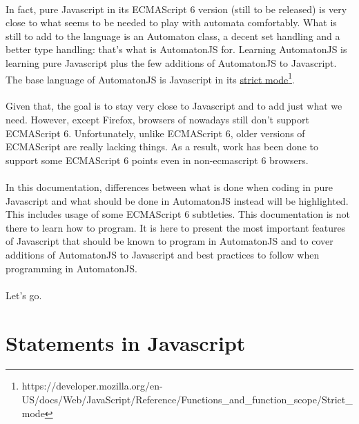 \documentclass{article}
\begin{document}
\begin{sloppypar}
   
\paragraph{}
In fact, pure Javascript in its ECMAScript 6 version (still to be released) is very close to what seems to be needed to play with automata comfortably. What is still to add to the language is an Automaton class, a decent set handling and a better type handling: that's what is AutomatonJS for. Learning AutomatonJS is learning pure Javascript plus the few additions of AutomatonJS to Javascript. The base language of AutomatonJS is Javascript in its \href{https://developer.mozilla.org/en-US/docs/Web/JavaScript/Reference/Functions_and_function_scope/Strict_mode}{strict mode}\footnote{https://developer.mozilla.org/en-US/docs/Web/JavaScript/Reference/Functions\_and\_function\_scope/Strict\_mode}.

   
\paragraph{}
Given that, the goal is to stay very close to Javascript and to add just what we need. However, except Firefox, browsers of nowadays still don't support ECMAScript 6. Unfortunately, unlike ECMAScript 6, older versions of ECMAScript are really lacking things. As a result, work has been done to support some ECMAScript 6 points even in non-ecmascript 6 browsers.

   
\paragraph{}
In this documentation, differences between what is done when coding in pure Javascript and what should be done in AutomatonJS instead will be highlighted. This includes usage of some ECMAScript 6 subtleties. This documentation is not there to learn how to program. It is here to present the most important features of Javascript that should be known to program in AutomatonJS and to cover additions of AutomatonJS to Javascript and best practices to follow when programming in AutomatonJS.

   
\paragraph{}
Let's go.



\newpage



\section{ Statements in Javascript}



\end{sloppypar}
\end{document}
